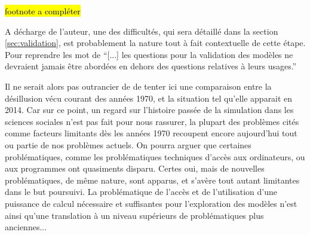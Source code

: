 

\hl{footnote a compléter}


A décharge de l'auteur, une des difficultés, qui sera détaillé dans la section \ref{sec:validation}, est probablement la nature tout à fait contextuelle de cette étape. Pour reprendre les mot de \textcite{Amblard2006} \enquote{[...] les questions pour  la validation des modèles ne devraient jamais être abordées en dehors des questions relatives à leurs usages.}

Il ne serait alors pas outrancier de de tenter ici une comparaison entre la désillusion vécu courant des années 1970, et la situation tel qu'elle apparait en 2014. Car sur ce point, un regard sur l'histoire passée de la simulation dans les sciences sociales n'est pas fait pour nous rassurer, la plupart des problèmes cités comme facteurs limitants dès les années 1970 recoupent encore aujourd'hui tout ou partie de nos problèmes actuels. On pourra arguer que certaines problématiques, comme les problématiques techniques d'accès aux ordinateurs, ou aux programmes ont quasiments disparu. Certes oui, mais de nouvelles problématiques, de même nature, sont apparus, et s'avère tout autant limitantes dans le but poursuivi. La problématique de l'accès et de l'utilisation d'une puissance de calcul nécessaire et suffisantes pour l'exploration des modèles n'est ainsi qu'une translation à un niveau supérieurs de problématiques plus anciennes...

